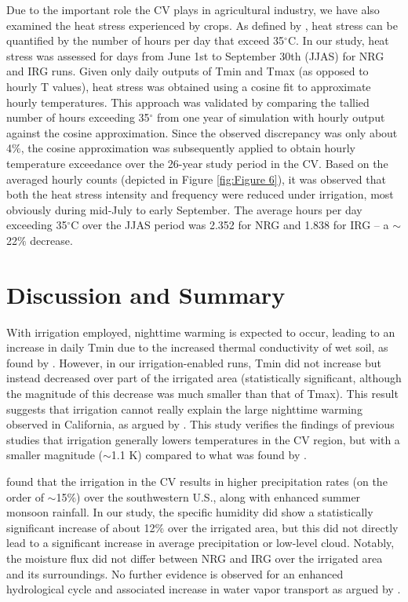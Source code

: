 \documentclass[draft,ms]{agutex}   %
\begin{document}
\begin{article}
Due to the important role the CV plays in agricultural industry, we have also examined the heat stress experienced by crops. As defined by \cite{teixeira2013global}, heat stress can be quantified by the number of hours per day that exceed 35$^\circ$C. In our study, heat stress was assessed for days from June 1st to September 30th (JJAS) for NRG and IRG runs. Given only daily outputs of Tmin and Tmax (as opposed to hourly T values), heat stress was obtained using a cosine fit to approximate hourly temperatures. This approach was validated by comparing the tallied number of hours exceeding 35$^\circ$ from one year of simulation with hourly output against the cosine approximation. Since the observed discrepancy was only about 4$\%$, the cosine approximation was subsequently applied to obtain hourly temperature exceedance over the 26-year study period in the CV. Based on the averaged hourly counts (depicted in Figure \ref{fig:Figure 6}), it was observed that both the heat stress intensity and frequency were reduced under irrigation, most obviously during mid-July to early September. The average hours per day exceeding 35$^\circ$C over the JJAS period was 2.352 for NRG and 1.838 for IRG -- a $\sim$22$\%$ decrease.

\section{Discussion and Summary}

With irrigation employed, nighttime warming is expected to occur, leading to an increase in daily Tmin due to the increased thermal conductivity of wet soil, as found by \cite{kanamaru2008model}. However, in our irrigation-enabled runs, Tmin did not increase but instead decreased over part of the irrigated area (statistically significant, although the magnitude of this decrease was much smaller than that of Tmax). This result suggests that irrigation cannot really explain the large nighttime warming observed in California, as argued by \citet{bonfils2007empirical}. This study verifies the findings of previous studies that irrigation generally lowers temperatures in the CV region, but with a smaller magnitude ($\sim$1.1 K) compared to what was found by \citet{lobell2006biogeophysical}. 

\cite{lo2013irrigation} found that the irrigation in the CV results in higher precipitation rates (on the order of $\sim$15$\%$) over the southwestern U.S., along with enhanced summer monsoon rainfall. In our study, the specific humidity did show a statistically significant increase of about 12$\%$ over the irrigated area, but this did not directly lead to a significant increase in average precipitation or low-level cloud. Notably, the moisture flux did not differ between NRG and IRG over the irrigated area and its surroundings. No further evidence is observed for an enhanced hydrological cycle and associated increase in water vapor transport as argued by \cite{lo2013irrigation}. 


\end{article}
\end{document}
